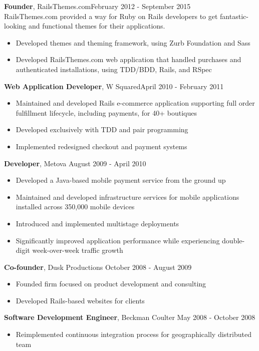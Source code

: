 \documentclass[line, margin, 10pt]{res}
\begin{document}
\begin{resume}
{\bf Founder}, RailsThemes.com\hfill February 2012 - September 2015\\
RailsThemes.com provided a way for Ruby on Rails developers to get fantastic-looking and functional themes for their applications.
\begin{itemize} \itemsep -2pt  %
    \item Developed themes and theming framework, using Zurb Foundation and Sass
    \item Developed RailsThemes.com web application that handled purchases and authenticated installations, using TDD/BDD, Rails, and RSpec
\end{itemize}

{\bf Web Application Developer}, W Squared\hfill April 2010 - February 2011
\begin{itemize} \itemsep -2pt
\item Maintained and developed Rails e-commerce application supporting full order fulfillment lifecycle, including payments, for 40+ boutiques
\item Developed exclusively with TDD and pair programming
\item Implemented redesigned checkout and payment systems
\end{itemize}

{\bf Developer}, Metova \hfill August 2009 - April 2010
\begin{itemize} \itemsep -2pt
\item Developed a Java-based mobile payment service from the ground up
\item Maintained and developed infrastructure services for mobile applications installed across 350,000 mobile devices
\item Introduced and implemented multistage deployments
\item Significantly improved application performance while experiencing double-digit week-over-week traffic growth
\end{itemize}

{\bf Co-founder}, Dusk Productions \hfill October 2008 - August 2009
\begin{itemize} \itemsep -2pt
\item Founded firm focused on product development and consulting
\item Developed Rails-based websites for clients
\end{itemize}

{\bf Software Development Engineer}, Beckman Coulter \hfill May 2008 - October 2008
\begin{itemize} \itemsep -2pt
\item Reimplemented continuous integration process for geographically distributed team
\end{itemize}


\end{resume}
\end{document}
